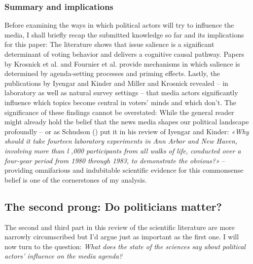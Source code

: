 \documentclass[11pt,a4paper]{article}
\begin{document}
\subsubsection{Summary and implications}
Before examining the ways in which political actors will try to influence the media, I shall briefly recap the submitted knowledge so far and its implications for this paper: The literature shows that issue salience is a significant determinant of voting behavior and delivers a cognitive causal pathway. Papers by Krosnick et al. and Fournier et al. provide mechanisms in which salience is determined by agenda-setting processes and priming effects. Lastly, the publications by Iyengar and Kinder and Miller and Krosnick revealed – in laboratory as well as natural survey settings – that media actors significantly influence which topics become central in voters’ minds and which don’t. The significance of these findings cannot be overstated: While the general reader might already hold the belief that the news media shapes our political landscape profoundly – or as Schudson (\citeyear{schudson_news_1988}) put it in his review of Iyengar and Kinder: \textit{«Why should it take fourteen laboratory experiments in Ann Arbor and New Haven, involving more than l ,000 participants from all walks of life, conducted over a four-year period from 1980 through 1983, to demonstrate the obvious?»} – providing omnifarious and indubitable scientific evidence for this commonsense belief is one of the cornerstones of my analysis. 


\subsection{The second prong: Do politicians matter?}
The second and third part in this review of the scientific literature are more narrowly circumscribed but I’d argue just as important as the first one. I will now turn to the question: \textit{What does the state of the sciences say about political actors’ influence on the media agenda?} 
\end{document}
